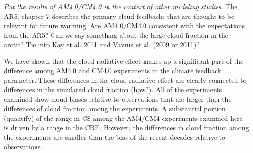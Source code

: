 \documentclass[draft]{agujournal2019}
\begin{document}
\textit{Put the results of AM4.0/CM4.0 in the context of other modeling studies.}  
The AR5, chapter 7 describes the primary 
cloud feedbacks that are thought to be relevant for future warming.  Are AM4.0/CM4.0 consistent with the expectations from the AR5?  Can we say something about the large cloud fraction in the arctic?  Tie into Kay et al. 2011 and Vavrus et al. (2009 or 2011)?

We have shown that the cloud radiative effect makes up a significant part of the difference 
among AM4.0 and CM4.0 experiments in the climate feedback parameter.  These differences in the cloud radiative
effect are clearly connected to differences in the simulated cloud fraction (how?).  
All of the experiments examined show cloud biases relative to observations that are larger than the differences of cloud fraction among the experiments.    
A substantial portion (quantify) of the range in CS among the AM4/CM4 experiments examined here is 
driven by a range in the CRE.  However, the differences in cloud fraction among the experiments are smaller than 
the bias of the recent decades relative to observations.  

\end{document}
